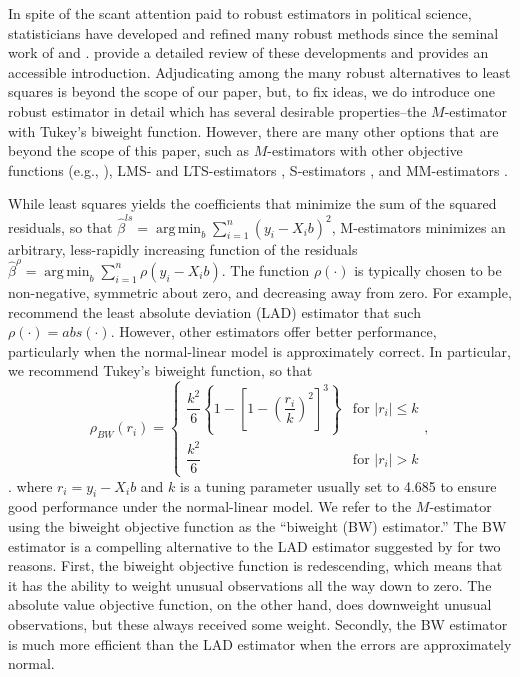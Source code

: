 \documentclass[12pt]{article}
\DeclareMathOperator*{\argmin}{arg\,min}
\begin{document}
In spite of the scant attention paid to robust estimators in political science, statisticians have developed and refined many robust methods since the seminal work of \cite{Box1953} and \cite{Huber1964}. 
\cite{HuberRonchetti2009} provide a detailed review of these developments and \cite{Anderson2008} provides an accessible introduction. 
Adjudicating among the many robust alternatives to least squares is beyond the scope of our paper, but, to fix ideas, we do introduce one robust estimator in detail which has several desirable properties--the $M$-estimator with Tukey's biweight function. 
However, there are many other options that are beyond the scope of this paper, such as $M$-estimators with other objective functions (e.g., \citealt{Huber1973}), LMS- and LTS-estimators \citep{Rousseeuw1984}, S-estimators \citep{RousseeuwYohai1984}, and MM-estimators \citep{Yohai1987}.

While least squares yields the coefficients that minimize the sum of the squared residuals, so that $\hat{\beta}^{ls} =\argmin_{b} \sum_{i = 1}^n (y_i - X_ib)^2$, M-estimators minimizes an arbitrary, less-rapidly increasing function of the residuals $\hat{\beta}^{\rho} =\argmin_{b} \sum_{i = 1}^n \rho(y_i - X_ib)$. 
The function $\rho(\cdot)$ is typically chosen to be non-negative, symmetric about zero, and decreasing away from zero. 
For example, \citep{HardenDesmarais2011} recommend the least absolute deviation (LAD) estimator \citep{Dodge1987} that such $\rho(\cdot) = abs(\cdot)$. 
However, other estimators offer better performance, particularly when the normal-linear model is approximately correct. 
In particular, we recommend Tukey's biweight function, so that
\begin{displaymath}
   \rho_{BW}(r_i) = \left\{
     \begin{array}{lr}
       \dfrac{k^2}{6}\left\{ 1 - \left[ 1 - \left( \dfrac{r_i}{k} \right)^2 \right]^3\right\} & \text{for } |r_i| \leq k\\
        \dfrac{k^2}{6} & \text{for } |r_i| > k 
\end{array}
   \right.,
\end{displaymath}.
\noindent where $r_i = y_i - X_ib$ and $k$ is a tuning parameter usually set to 4.685 to ensure good performance under the normal-linear model. 
We refer to the $M$-estimator using the biweight objective function as the ``biweight (BW) estimator.'' 
The BW estimator is a compelling alternative to the LAD estimator suggested by \citep{HardenDesmarais2011} for two reasons. 
First, the biweight objective function is redescending, which means that it has the ability to weight unusual observations all the way down to zero. 
The absolute value objective function, on the other hand, does downweight unusual observations, but these always received some weight. 
Secondly, the BW estimator is much more efficient than the LAD estimator when the errors are approximately normal. 
\end{document}
